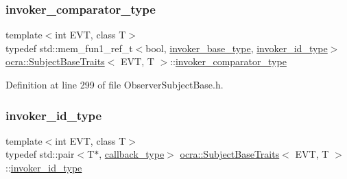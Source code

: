 \hypertarget{structocra_1_1SubjectBaseTraits_a791cf85201dfcbdc6213946c36d698ca}{}\label{structocra_1_1SubjectBaseTraits_a791cf85201dfcbdc6213946c36d698ca} 
\subsubsection{\texorpdfstring{invoker\+\_\+comparator\+\_\+type}{invoker\_comparator\_type}}
{\footnotesize\ttfamily template$<$int E\+VT, class T$>$ \\
typedef std\+::mem\+\_\+fun1\+\_\+ref\+\_\+t$<$bool, \hyperlink{structocra_1_1SubjectBaseTraitsBase_a439671662c8f8f3e80e6675f008dec3f}{invoker\+\_\+base\+\_\+type}, \hyperlink{structocra_1_1SubjectBaseTraits_a2c4f3af9b3e93bf96232c36df6f43986}{invoker\+\_\+id\+\_\+type}$>$ \hyperlink{structocra_1_1SubjectBaseTraits}{ocra\+::\+Subject\+Base\+Traits}$<$ E\+VT, T $>$\+::\hyperlink{structocra_1_1SubjectBaseTraits_a791cf85201dfcbdc6213946c36d698ca}{invoker\+\_\+comparator\+\_\+type}}



Definition at line 299 of file Observer\+Subject\+Base.\+h.

\hypertarget{structocra_1_1SubjectBaseTraits_a2c4f3af9b3e93bf96232c36df6f43986}{}\label{structocra_1_1SubjectBaseTraits_a2c4f3af9b3e93bf96232c36df6f43986} 
\subsubsection{\texorpdfstring{invoker\+\_\+id\+\_\+type}{invoker\_id\_type}}
{\footnotesize\ttfamily template$<$int E\+VT, class T$>$ \\
typedef std\+::pair$<$T$\ast$, \hyperlink{structocra_1_1SubjectBaseTraits_ab8c572ba6805d72ddf4137da6e2f4480}{callback\+\_\+type}$>$ \hyperlink{structocra_1_1SubjectBaseTraits}{ocra\+::\+Subject\+Base\+Traits}$<$ E\+VT, T $>$\+::\hyperlink{structocra_1_1SubjectBaseTraits_a2c4f3af9b3e93bf96232c36df6f43986}{invoker\+\_\+id\+\_\+type}}




